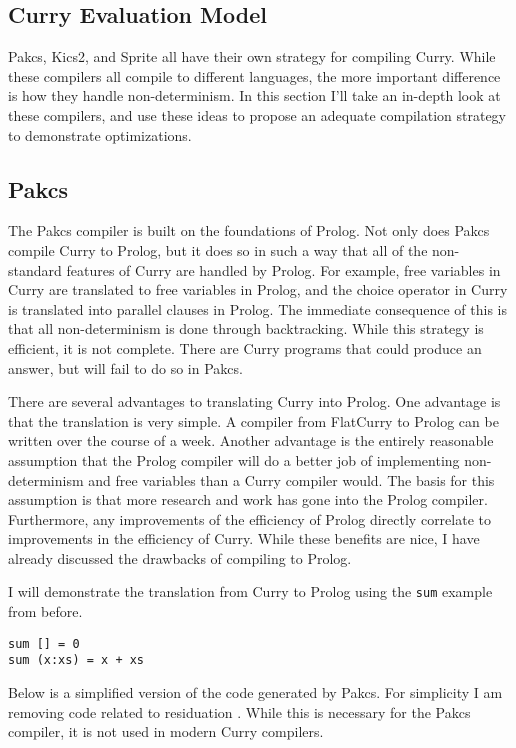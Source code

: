 
\subsection{Curry Evaluation Model}

Pakcs, Kics2, and Sprite all have their own strategy for compiling Curry.
While these compilers all compile to different languages,
the more important difference is how they handle non-determinism.
In this section I'll take an in-depth look at these compilers,
and use these ideas to propose an adequate compilation strategy
to demonstrate optimizations.

\subsection{Pakcs}

The Pakcs compiler is built on the foundations of Prolog.
Not only does Pakcs compile Curry to Prolog,
but it does so in such a way that all of the non-standard features 
of Curry are handled by Prolog.
For example, free variables in Curry are translated to free variables in Prolog,
and the choice operator in Curry is translated into parallel clauses in Prolog.
The immediate consequence of this is that all non-determinism is done through backtracking.
While this strategy is efficient, it is not complete.
There are Curry programs that could produce an answer, but will fail to do so in Pakcs.

There are several advantages to translating Curry into Prolog.
One advantage is that the translation is very simple.
A compiler from FlatCurry to Prolog can be written over the course of a week.
Another advantage is the entirely reasonable assumption that the Prolog compiler
will do a better job of implementing non-determinism and free variables than a Curry compiler would.
The basis for this assumption is that more research and work has gone into the Prolog compiler.
Furthermore, any improvements of the efficiency of Prolog directly correlate to improvements
in the efficiency of Curry.
While these benefits are nice, I have already discussed the drawbacks of compiling to Prolog.

I will demonstrate the translation from Curry to Prolog using the \texttt{sum} example from before.

\begin{verbatim}
sum [] = 0
sum (x:xs) = x + xs
\end{verbatim}

Below is a simplified version of the code generated by Pakcs.
For simplicity I am removing code related to residuation \cite{Hanus17PAKCS}.
While this is necessary for the Pakcs compiler, it is not used in modern Curry compilers.

